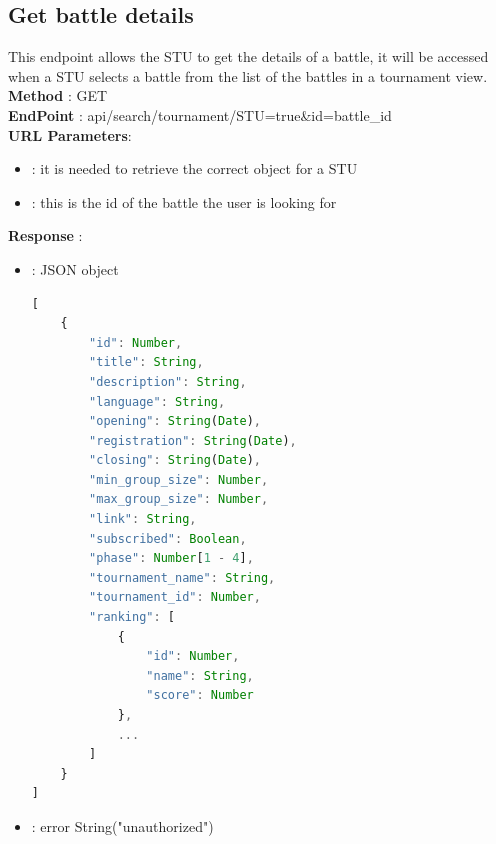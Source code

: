 \subsection*{Get battle details}
This endpoint allows the STU to get the details of a battle, it will be accessed when a STU selects a battle from the list of the battles in a tournament view.\\
\textbf{Method} : GET \\
\textbf{EndPoint} : api/search/tournament/STU=true\&id=battle\_id\\
\textbf{URL Parameters}:
\begin{itemize}
    \item {} : it is needed to retrieve the correct object for a STU
    \item {} : this is the id of the battle the user is looking for
\end{itemize}
\textbf{Response} : 
    \begin{itemize}
        \item {} : JSON object
        \begin{lstlisting}[language=JavaScript, label={lst:jscode}, basicstyle=\ttfamily]
[
    {
        "id": Number,
        "title": String,
        "description": String,
        "language": String,
        "opening": String(Date),
        "registration": String(Date),
        "closing": String(Date),
        "min_group_size": Number,
        "max_group_size": Number,
        "link": String,
        "subscribed": Boolean,
        "phase": Number[1 - 4],
        "tournament_name": String,
        "tournament_id": Number,
        "ranking": [
            {
                "id": Number,
                "name": String,
                "score": Number
            },
            ...
        ]
    }
]
        \end{lstlisting} 
        \item {} : error String("unauthorized")
    \end{itemize}

